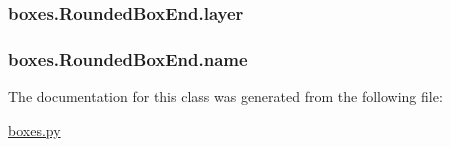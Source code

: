 \subsubsection[{layer}]{\setlength{\rightskip}{0pt plus 5cm}boxes.\+Rounded\+Box\+End.\+layer}\label{classboxes_1_1_rounded_box_end_a7c010d7f52ed873fb0cac5a8d9d66ef9}
\hypertarget{classboxes_1_1_rounded_box_end_a45d2a6098b926041ff90261c3a91812d}{}
\subsubsection[{name}]{\setlength{\rightskip}{0pt plus 5cm}boxes.\+Rounded\+Box\+End.\+name}\label{classboxes_1_1_rounded_box_end_a45d2a6098b926041ff90261c3a91812d}


The documentation for this class was generated from the following file\+:\begin{DoxyCompactItemize}
\item 
\hyperlink{boxes_8py}{boxes.\+py}\end{DoxyCompactItemize}
